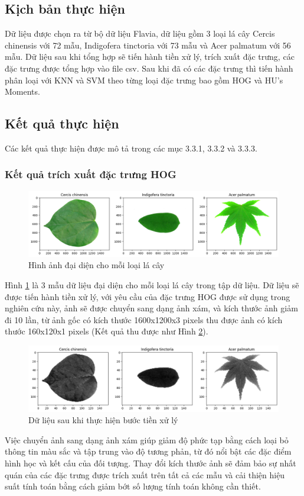 \documentclass[a4paper]{article}
\begin{document}
\subsection{Kịch bản thực hiện}
Dữ liệu được chọn ra từ bộ dữ liệu Flavia, dữ liệu gồm 3 loại lá cây Cercis chinensis với 72 mẫu, Indigofera tinctoria với 73 mẫu và Acer palmatum với 56 mẫu. Dữ liệu sau khi tổng hợp sẽ tiến hành tiền xử lý, trích xuất đặc trưng, các đặc trưng được tổng hợp vào file csv. Sau khi đã có các đặc trưng thì tiến hành phân loại với KNN và SVM theo từng loại đặc trưng bao gồm HOG và HU's Moments. 

\subsection{Kết quả thực hiện}
Các kết quả thực hiện được mô tả trong các mục 3.3.1, 3.3.2 và 3.3.3. 
\subsubsection{Kết quả trích xuất đặc trưng HOG}

\begin{figure}
    \centering
    \includegraphics[width=0.85\linewidth]{images/hog1.png}
    \caption{Hình ảnh đại diện cho mỗi loại lá cây}
    \label{fig:hog1}
\end{figure}
Hình \ref{fig:hog1} là 3 mẫu dữ liệu đại diện cho mỗi loại lá cây trong tập dữ liệu. Dữ liệu sẽ được tiến hành tiền xử lý, với yêu cầu của đặc trưng HOG được sử dụng trong nghiên cứu này, ảnh sẽ được chuyển sang dạng ảnh xám, và kích thước ảnh giảm đi 10 lần, từ ảnh gốc có kích thước 1600x1200x3 pixels thu được ảnh có kích thước 160x120x1 pixels (Kết quả thu được như Hình \ref{fig:hog2}). 
\begin{figure}
    \centering
    \includegraphics[width=0.85\linewidth]{images/hog2.png}
    \caption{Dữ liệu sau khi thực hiện bước tiền xử lý}
    \label{fig:hog2}
\end{figure}
Việc chuyển ảnh sang dạng ảnh xám giúp giảm độ phức tạp bằng cách loại bỏ thông tin màu sắc và tập trung vào độ tương phản, từ đó nổi bật các đặc điểm hình học và kết cấu của đối tượng. Thay đổi kích thước ảnh sẽ đảm bảo sự nhất quán của các đặc trưng được trích xuất trên tất cả các mẫu và cải thiện hiệu suất tính toán bằng cách giảm bớt số lượng tính toán không cần thiết.
\end{document}
